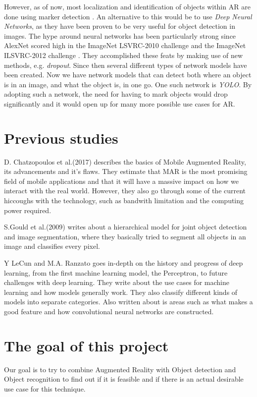 However, as of now, most localization and identification of objects within AR are done using marker detection \cite{markerDetection}. An alternative to this would be to use \textit{Deep Neural Networks}, as they have been proven to be very useful for object detection in images. The hype around neural networks has been particularly strong since AlexNet scored high in the ImageNet LSVRC-2010 challenge and the ImageNet ILSVRC-2012 challenge \cite{NIPS2012_4824}. They accomplished these feats by making use of new methods, e.g. \textit{dropout}. Since then several different types of network models have been created. Now we have network models that can detect both where an object is in an image, and what the object is, in one go. One such network is \textit{YOLO}\cite{YOLO1}. By adopting such a network, the need for having to mark objects would drop significantly and it would open up for many more possible use cases for AR.
 
\section{Previous studies}
\label{subsecPrevStud}
D. Chatzopoulos et al.(2017) describes the basics of Mobile Augmented Reality, its advancements and it's flaws. They estimate that MAR is the most promising field of mobile applications and that it will have a massive impact on how we interact with the real world. However, they also go through some of the current hiccoughs with the technology, such as bandwith limitation and the computing power required. 
\cite{MARS}

S.Gould et al.(2009) writes about a hierarchical model for joint object detection and image segmentation, where they basically tried to segment all objects in an image and classifies every pixel. 
\cite{NIPS2009_3766}


Y LeCun and M.A. Ranzato goes in-depth on the history and progress of deep learning, from the first machine learning model, the Perceptron, to future challenges with deep learning. They write about the use cases for machine learning and how models generally work. They also classify different kinds of models into separate categories. Also written about is areas such as what makes a good feature and how convolutional neural networks are constructed.
\cite{deepLearningTutorial}


\section{The goal of this project}
\label{subsecGoal}
Our goal is to try to combine Augmented Reality with Object detection and Object recognition to find out if it is feasible and if there is an actual desirable use case for this technique. 

